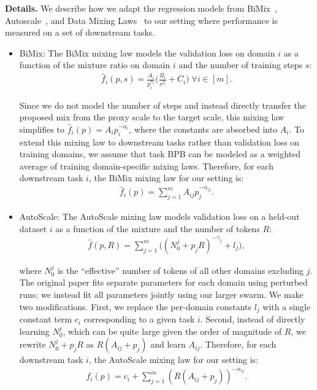 \textbf{Details.} We describe how we adapt the regression models from BiMix~\citep{ge2025bimixbivariatedatamixing}, Autoscale~\citep{kang2025autoscalescaleawaredatamixing}, and Data Mixing Laws~\citep{ye2025datamixinglawsoptimizing} to our setting where performance is measured on a set of downstream tasks.

\begin{itemize}
    \item BiMix: The BiMix mixing law models the validation loss on domain $i$ as a function of the mixture ratio on domain $i$ and the number of training steps $s$:
    \begin{align}
        \hat{f}_i(p, s) = \frac{A_i}{p_i^{\alpha_i}} \bigg( \frac{B_i}{s^{\beta_i}} + C_i\bigg) \; \forall i \in [m].
    \end{align}

    Since we do not model the number of steps and instead directly transfer the proposed mix from the proxy scale to the target scale, this mixing law simplifies to $\hat{f}_i(p) = A_i p_i^{-\alpha_i}$, where the constants are absorbed into $A_i$. To extend this mixing law to downstream tasks rather than validation loss on training domains, we assume that task BPB can be modeled as a weighted average of training domain-specific mixing laws. Therefore, for each downstream task $i$, the BiMix mixing law for our setting is:
    \begin{align}
        \hat{f}_i(p) = \sum_{j = 1}^m A_{ij} p_j^{-\alpha_{ij}}.
    \end{align}

    \item AutoScale: The AutoScale mixing law models validation loss on a held-out dataset $i$ as a function of the mixture and the number of tokens $R$:
    \begin{align}
        \hat{f}(p, R) = \sum_{j = 1}^m \bigg((N^{j}_0 + p_j R)^{-\gamma_{j}} + l_j\bigg),
     \end{align}

     where $N^j_0$ is the ``effective'' number of tokens of all other domains excluding $j$.
     The original paper fits separate parameters for each domain using perturbed runs; we instead fit all parameters jointly using our larger swarm. We make two modifications. First, we replace the per-domain constants $l_j$ with a single constant term $c_i$ corresponding to a given task $i$. Second, instead of directly learning $N^j_0$, which can be quite large given the order of magnitude of $R$, we rewrite $N^j_0 + p_j R$ as $R(A_{ij} + p_j)$ and learn $A_{ij}$. Therefore, for each downstream task $i$, the AutoScale mixing law for our setting is:
     \begin{align}
         \hat{f}_i(p) = c_i + \sum_{j = 1}^m (R(   A_{ij} + p_j))^{-\alpha_{ij}}.
     \end{align}


\end{itemize}
